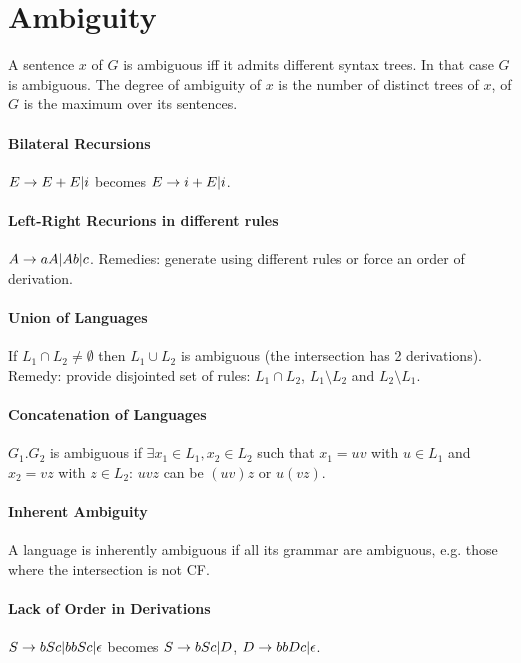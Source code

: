 \section{Ambiguity}

A sentence $x$ of $G$ is ambiguous iff it admits different syntax trees. In that case $G$ is ambiguous. The degree of ambiguity of $x$ is the number of distinct trees of $x$, of $G$ is the maximum over its sentences.

\paragraph{Bilateral Recursions} $E \rightarrow E + E | i$ becomes $E \rightarrow i + E | i$.

\paragraph{Left-Right Recurions in different rules} $A \rightarrow aA | Ab | c$. Remedies: generate using different rules or force an order of derivation.

\paragraph{Union of Languages} If $L_1 \cap L_2 \ne \emptyset$ then $L_1 \cup L_2$ is ambiguous (the intersection has 2 derivations). Remedy: provide disjointed set of rules: $L_1 \cap L_2$, $L_1 \setminus L_2$ and $L_2 \setminus L_1$.

\paragraph{Concatenation of Languages} $G_1 . G_2$ is ambiguous if $\exists x_1 \in L_1, x_2 \in L_2$ such that $x_1 = uv$ with $u \in L_1$ and $x_2 = vz$ with $z \in L_2$: $uvz$ can be $(uv)z$ or $u(vz)$.

\paragraph{Inherent Ambiguity} A language is inherently ambiguous if all its grammar are ambiguous, e.g. those where the intersection is not CF.

\paragraph{Lack of Order in Derivations} $S \rightarrow bSc | bbSc | \epsilon$ becomes $S \rightarrow bSc | D$, $D \rightarrow bbDc | \epsilon$.
